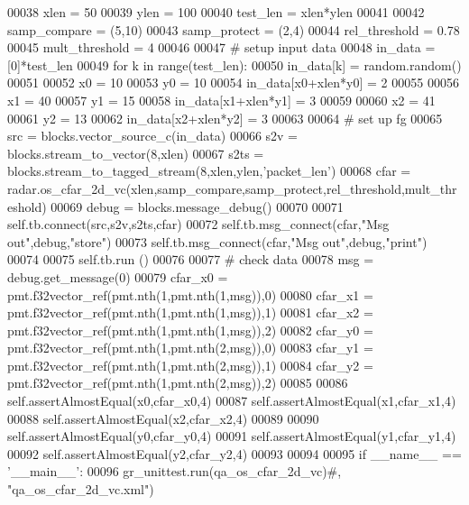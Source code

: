 \begin{DoxyCode}
00038         xlen = 50
00039         ylen = 100
00040         test\_len = xlen*ylen
00041         
00042         samp\_compare = (5,10)
00043         samp\_protect = (2,4)
00044         rel\_threshold = 0.78
00045         mult\_threshold = 4
00046         
00047         \textcolor{comment}{# setup input data}
00048         in\_data = [0]*test\_len
00049         \textcolor{keywordflow}{for} k \textcolor{keywordflow}{in} range(test\_len):
00050             in\_data[k] = random.random()
00051         
00052         x0 = 10
00053         y0 = 10
00054         in\_data[x0+xlen*y0] = 2
00055         
00056         x1 = 40
00057         y1 = 15
00058         in\_data[x1+xlen*y1] = 3
00059         
00060         x2 = 41
00061         y2 = 13
00062         in\_data[x2+xlen*y2] = 3
00063         
00064         \textcolor{comment}{# set up fg}
00065         src = blocks.vector\_source\_c(in\_data)
00066         s2v = blocks.stream\_to\_vector(8,xlen)
00067         s2ts = blocks.stream\_to\_tagged\_stream(8,xlen,ylen,\textcolor{stringliteral}{'packet\_len'})
00068         cfar = radar.os\_cfar\_2d\_vc(xlen,samp\_compare,samp\_protect,rel\_threshold,mult\_threshold)
00069         debug = blocks.message\_debug()
00070         
00071         self.tb.connect(src,s2v,s2ts,cfar)
00072         self.tb.msg\_connect(cfar,\textcolor{stringliteral}{"Msg out"},debug,\textcolor{stringliteral}{"store"})
00073         self.tb.msg\_connect(cfar,\textcolor{stringliteral}{"Msg out"},debug,\textcolor{stringliteral}{"print"})
00074         
00075         self.tb.run ()
00076         
00077         \textcolor{comment}{# check data}
00078         msg = debug.get\_message(0)
00079         cfar\_x0 =  pmt.f32vector\_ref(pmt.nth(1,pmt.nth(1,msg)),0)
00080         cfar\_x1 =  pmt.f32vector\_ref(pmt.nth(1,pmt.nth(1,msg)),1)
00081         cfar\_x2 =  pmt.f32vector\_ref(pmt.nth(1,pmt.nth(1,msg)),2)
00082         cfar\_y0 =  pmt.f32vector\_ref(pmt.nth(1,pmt.nth(2,msg)),0)
00083         cfar\_y1 =  pmt.f32vector\_ref(pmt.nth(1,pmt.nth(2,msg)),1)
00084         cfar\_y2 =  pmt.f32vector\_ref(pmt.nth(1,pmt.nth(2,msg)),2)
00085         
00086         self.assertAlmostEqual(x0,cfar\_x0,4)
00087         self.assertAlmostEqual(x1,cfar\_x1,4)
00088         self.assertAlmostEqual(x2,cfar\_x2,4)
00089         
00090         self.assertAlmostEqual(y0,cfar\_y0,4)
00091         self.assertAlmostEqual(y1,cfar\_y1,4)
00092         self.assertAlmostEqual(y2,cfar\_y2,4)
00093 
00094 
00095 \textcolor{keywordflow}{if} \_\_name\_\_ == \textcolor{stringliteral}{'\_\_main\_\_'}:
00096     gr\_unittest.run(qa\_os\_cfar\_2d\_vc)\textcolor{comment}{#, "qa\_os\_cfar\_2d\_vc.xml")}
\end{DoxyCode}
